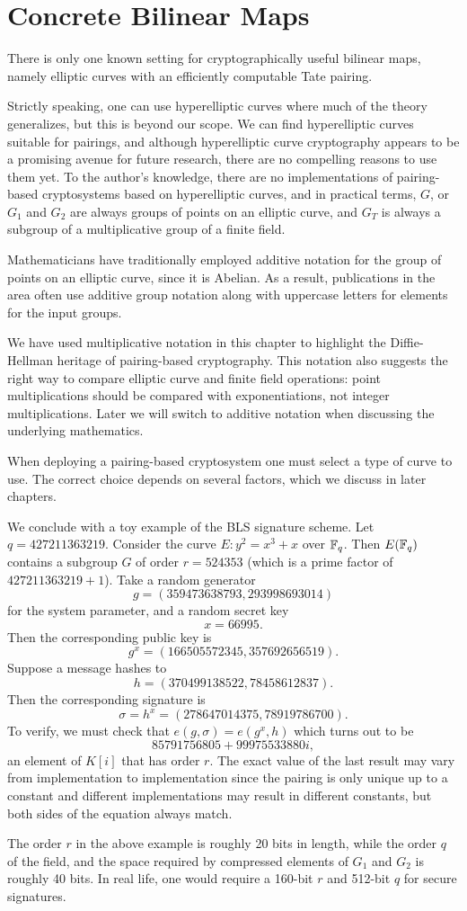 \section{Concrete Bilinear Maps}

There is only one known setting for cryptographically useful bilinear maps,
namely elliptic curves with an efficiently computable
Tate pairing.

Strictly speaking, one can use hyperelliptic
curves where much of the theory generalizes, but this is beyond
our scope.
We can find hyperelliptic
curves~\cite{galbraith,rubinsilverberg,freemanhyper} suitable for
pairings, and although hyperelliptic curve cryptography appears to
be a promising avenue for future research, there are no compelling reasons
to use them yet.
To the author's knowledge, there are no implementations
of pairing-based cryptosystems based on hyperelliptic curves,
and in practical terms, $G$, or $G_1$ and $G_2$ are always
groups of points on
an elliptic curve, and $G_T$ is always a subgroup of a multiplicative group
of a finite field.

Mathematicians have traditionally employed additive notation for the
group of points on an elliptic curve, since it is
Abelian. As a result, publications in the area often use additive group
notation along with uppercase letters for elements for the input groups.

We have used multiplicative notation in this chapter to highlight the
Diffie-Hellman heritage of pairing-based cryptography. This notation also
suggests the right way to compare elliptic curve and finite field operations:
point multiplications should be compared with exponentiations, not
integer multiplications. Later we will switch to additive notation when
discussing the underlying mathematics.

When deploying a pairing-based cryptosystem one must select a type of
curve to use. The correct choice depends on several factors,
which we discuss in later chapters.

We conclude with a toy example of the BLS signature scheme.
Let $q = 427211363219$.
Consider the curve $E : y^2 = x^3 + x$ over
$\mathbb{F}_q$. Then $E(\mathbb{F}_q)$ contains a subgroup
$G$ of order $r = 524353$ (which is a prime factor of $427211363219 + 1$).
Take a random generator
\[ g = (359473638793, 293998693014) \]
for the system parameter, and a random secret key
\[ x = 66995 . \]
Then the corresponding public key is
\[ g^x = (166505572345, 357692656519) . \]
Suppose a message hashes to
\[ h = (370499138522, 78458612837) . \]
Then the corresponding signature is
\[ \sigma = h^x = (278647014375, 78919786700) . \]
To verify, we must check that $e(g, \sigma) = e(g^x , h)$
which turns out to be
\[ 85791756805 + 99975533880i , \]
an element of $K[i]$ that has order $r$.
The exact value of the last result may vary
from implementation to implementation since the pairing is only unique up to a
constant and different implementations may result in different constants,
but both sides of the equation always match.

The order $r$ in the above example is roughly 20 bits in length,
while the order $q$ of the field, and the space required by
compressed elements of $G_1$ and $G_2$ is roughly 40 bits. In real life,
one would require a 160-bit $r$ and 512-bit $q$
for secure signatures.
